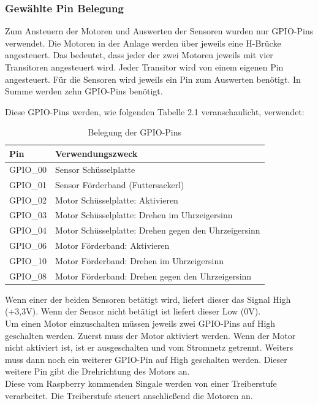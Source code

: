 \vspace{120pt}

\subsubsection{Gewählte Pin Belegung}
Zum Ansteuern der Motoren und Auswerten der Sensoren wurden nur GPIO-Pins verwendet. Die Motoren in der Anlage werden über jeweils eine H-Brücke angesteuert. Das bedeutet, dass jeder der zwei Motoren jeweils mit vier Transitoren angesteuert wird. Jeder Transitor wird von einem eigenen Pin angesteuert. Für die Sensoren wird jeweils ein Pin zum Auswerten benötigt. In Summe werden zehn GPIO-Pins benötigt. 

\newpage

Diese GPIO-Pins werden, wie folgenden Tabelle 2.1 veranschaulicht, verwendet:

\begin{table}[htb]
\centering
\begin{tabular}{|l|l|}
\hline
\textbf{Pin} & \textbf{Verwendungszweck}          \\ \hline
GPIO\_00     & Sensor Schüsselplatte              \\ \hline
GPIO\_01     & Sensor Förderband (Futtersackerl)  \\ \hline
GPIO\_02     & Motor Schüsselplatte: Aktivieren \\ \hline
GPIO\_03     & Motor Schüsselplatte: Drehen im Uhrzeigersinn \\ \hline
GPIO\_04     & Motor Schüsselplatte: Drehen gegen den Uhrzeigersinn \\ \hline
GPIO\_06     & Motor Förderband: Aktivieren     \\ \hline
GPIO\_10     & Motor Förderband: Drehen im Uhrzeigersinn     \\ \hline
GPIO\_08     & Motor Förderband: Drehen gegen den Uhrzeigersinn     \\ \hline
\end{tabular}
\caption{Belegung der GPIO-Pins}
\label{Pinbelegung}
\end{table}

Wenn einer der beiden Sensoren betätigt wird, liefert dieser das Signal High (+3,3V). Wenn der Sensor nicht betätigt ist liefert dieser Low (0V). 
\\ Um einen Motor einzuschalten müssen jeweils zwei GPIO-Pins auf High geschalten werden. Zuerst muss der Motor aktiviert werden. Wenn der Motor nicht aktiviert ist, ist er ausgeschalten und vom Stromnetz getrennt. Weiters muss dann noch ein weiterer GPIO-Pin auf High geschalten werden. Dieser weitere Pin gibt die Drehrichtung des Motors an.
\\ Diese vom Raspberry kommenden Singale werden von einer Treiberstufe verarbeitet. Die Treiberstufe steuert anschließend die Motoren an. 

